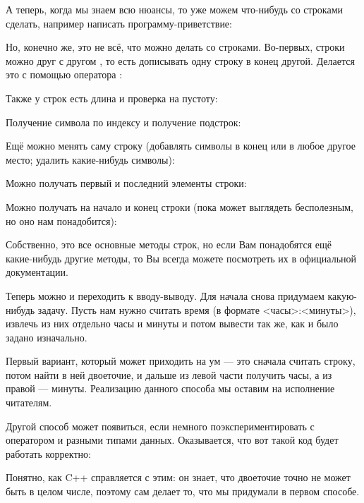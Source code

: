 {

А теперь, когда мы знаем всю нюансы, то уже можем что-нибудь со строками сделать, например написать программу-приветствие:


Но, конечно же, это не всё, что можно делать со строками. Во-первых, строки можно друг с другом , то есть дописывать одну строку в конец другой. Делается это с помощью оператора \lcpp{+}:


Также у строк есть длина и проверка на пустоту:


Получение символа по индексу и получение подстрок:


Ещё можно менять саму строку (добавлять символы в конец или в любое другое место; удалить какие-нибудь символы):


Можно получать первый и последний элементы строки:


Можно получать  на начало и конец строки (пока может выглядеть бесполезным, но оно нам понадобится):


Собственно, это все основные методы строк, но если Вам понадобятся ещё какие-нибудь другие методы, то Вы всегда можете посмотреть их в официальной документации.

Теперь можно и переходить к вводу-выводу. Для начала снова придумаем какую-нибудь задачу. Пусть нам нужно считать время (в формате <часы>:<минуты>), извлечь из них отдельно часы и минуты и потом вывести так же, как и было задано изначально.

Первый вариант, который может приходить на ум — это сначала считать строку, потом найти в ней двоеточие, и дальше из левой части получить часы, а из правой — минуты. Реализацию данного способа мы оставим на исполнение читателям.

Другой способ может появиться, если немного поэкспериментировать с оператором  и разными типами данных. Оказывается, что вот такой код будет работать корректно:


Понятно, как C++ справляется с этим: он знает, что двоеточие точно не может быть в целом числе, поэтому сам делает то, что мы придумали в первом способе.

}
